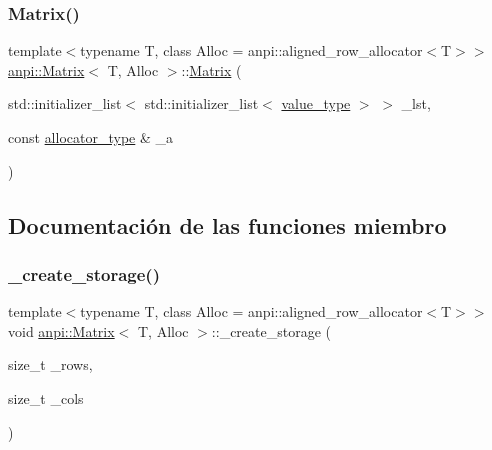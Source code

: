 \subsubsection{\texorpdfstring{Matrix()}{Matrix()}\hspace{0.1cm}{\footnotesize\ttfamily [17/17]}}
{\footnotesize\ttfamily template$<$typename T, class Alloc = anpi\+::aligned\+\_\+row\+\_\+allocator$<$\+T$>$$>$ \\
\hyperlink{classanpi_1_1Matrix}{anpi\+::\+Matrix}$<$ T, Alloc $>$\+::\hyperlink{classanpi_1_1Matrix}{Matrix} (\begin{DoxyParamCaption}\item[{std\+::initializer\+\_\+list$<$ std\+::initializer\+\_\+list$<$ \hyperlink{classanpi_1_1Matrix_ad755076524c16fc494a392b0a66065cb}{value\+\_\+type} $>$ $>$}]{\+\_\+lst,  }\item[{const \hyperlink{classanpi_1_1Matrix_a3574b7528e3ddfb2f7cdf446be8286c1}{allocator\+\_\+type} \&}]{\+\_\+a }\end{DoxyParamCaption})}



\subsection{Documentación de las funciones miembro}
\mbox{\label{classanpi_1_1Matrix_a4a02a0adb2750cabbbb8437d52b61452}} 
\subsubsection{\texorpdfstring{\+\_\+create\+\_\+storage()}{\_create\_storage()}}
{\footnotesize\ttfamily template$<$typename T, class Alloc = anpi\+::aligned\+\_\+row\+\_\+allocator$<$\+T$>$$>$ \\
void \hyperlink{classanpi_1_1Matrix}{anpi\+::\+Matrix}$<$ T, Alloc $>$\+::\+\_\+create\+\_\+storage (\begin{DoxyParamCaption}\item[{size\+\_\+t}]{\+\_\+rows,  }\item[{size\+\_\+t}]{\+\_\+cols }\end{DoxyParamCaption})\hspace{0.3cm}{\ttfamily [private]}}



